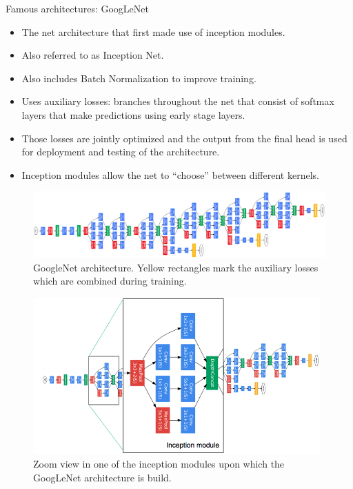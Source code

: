 \begin{vbframe}{Famous architectures: GoogLeNet}
  \begin{itemize}
    \item The net architecture that first made use of inception modules.
    \item Also referred to as Inception Net.
    \item Also includes Batch Normalization to improve training.
    \item Uses auxiliary losses: branches throughout the net that consist of softmax layers that make predictions using early stage layers.
    \item Those losses are jointly optimized and the output from the final head is used for deployment and testing of the architecture.
    \item Inception modules allow the net to \enquote{choose} between different kernels.
  \end{itemize}
\framebreak
  \begin{figure}
  \centering
    \includegraphics[width=11.5cm]{plots/architectures/googlenet.png}
    \caption{GoogleNet architecture. Yellow rectangles mark the auxiliary losses which are combined during training.}
  \end{figure}
\framebreak
  \begin{figure}
  \centering
    \includegraphics[width=11cm]{plots/05_conv_variations/inception/googlenet.png}
    \caption{Zoom view in one of the inception modules upon which the GoogLeNet architecture is build.}
  \end{figure}
\end{vbframe}
